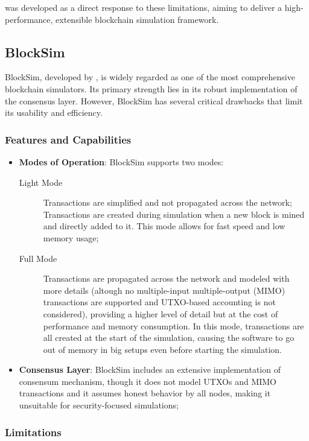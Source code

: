 \iblock{} was developed as a direct response to these limitations, aiming to
deliver a high-performance, extensible blockchain simulation framework.

\subsection{BlockSim}\label{subsec:blocksim}

BlockSim, developed by \citeauthor{blocksim} \cite{blocksim}, is widely
regarded as one of the most comprehensive blockchain simulators. Its primary
strength lies in its robust implementation of the consensus layer. However,
BlockSim has several critical drawbacks that limit its usability and
efficiency.

\subsubsection{Features and Capabilities}\label{subsubsec:blocksim-features}

\begin{itemize}
	\item \textbf{Modes of Operation}: BlockSim supports two modes:
		\begin{description}
			\item[Light Mode] Transactions are simplified and not
				propagated across the network; Transactions are
				created during simulation when a new block is
				mined and directly added to it. This mode
				allows for fast speed and low memory usage;
			\item[Full Mode] Transactions are propagated across the
				network and modeled with more details (altough
				no multiple-input multiple-output (MIMO)
				transactions are supported and UTXO-based
				accounting is not considered), providing a
				higher level of detail but at the cost of
				performance and memory consumption. In this
				mode, transactions are all created at the start
				of the simulation, causing the software to go
				out of memory in big setups even before
				starting the simulation.
		\end{description}
	\item \textbf{Consensus Layer}: BlockSim includes an extensive
		implementation of consensum mechanism, though it does not model
		UTXOs and MIMO transactions and it assumes honest behavior by
		all nodes, making it unsuitable for security-focused
		simulations;
\end{itemize}

\subsubsection{Limitations}\label{subsubsec:blocksim-limitations}

